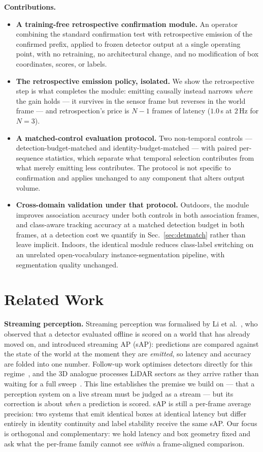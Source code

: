 \noindent\textbf{Contributions.}
\begin{itemize}\itemsep2pt
\item \textbf{A training-free retrospective confirmation module.} An operator
combining the standard confirmation test with retrospective emission of the
confirmed prefix, applied to frozen detector output at a single operating
point, with no retraining, no architectural change, and no modification of box
coordinates, scores, or labels.
\item \textbf{The retrospective emission policy, isolated.} We show the
retrospective step is what completes the module: emitting causally instead
narrows \emph{where} the gain holds --- it survives in the sensor frame but
reverses in the world frame --- and retrospection's price is $N{-}1$ frames
of latency ($1.0$\,s at $2$\,Hz for $N{=}3$).
\item \textbf{A matched-control evaluation protocol.} Two non-temporal
controls --- detection-budget-matched and identity-budget-matched --- with
paired per-sequence statistics, which separate what temporal selection
contributes from what merely emitting less contributes. The protocol is not
specific to confirmation and applies unchanged to any component that alters
output volume.
\item \textbf{Cross-domain validation under that protocol.} Outdoors, the
module improves association accuracy under both controls in both association
frames, and class-aware tracking accuracy at a matched detection budget in both
frames, at a detection cost we quantify in
Sec.~\ref{sec:detmatch} rather than leave implicit. Indoors, the identical module
reduces class-label switching on an unrelated open-vocabulary
instance-segmentation pipeline, with segmentation quality unchanged.
\end{itemize}

\section{Related Work}
\label{sec:related}

\noindent\textbf{Streaming perception.} Streaming perception was formalised by
Li et al.~\cite{streamingperception}, who observed that a detector evaluated
offline is scored on a world that has already moved on, and introduced streaming
AP (sAP): predictions are compared against the state of the world at the moment
they are \emph{emitted}, so latency and accuracy are folded into one number.
Follow-up work optimises detectors directly for this
regime~\cite{streamyolo}, and the 3D analogue processes LiDAR
sectors as they arrive rather than waiting for a full sweep~\cite{streaming3d}.
This line establishes the premise we build on --- that a perception system on a
live stream must be judged as a stream --- but its correction is about
\emph{when} a prediction is scored. sAP is still a per-frame average precision:
two systems that emit identical boxes at identical latency but differ entirely
in identity continuity and label stability receive the same sAP. Our focus is
orthogonal and complementary: we hold latency and box geometry fixed and ask
what the per-frame family cannot see \emph{within} a frame-aligned comparison.

